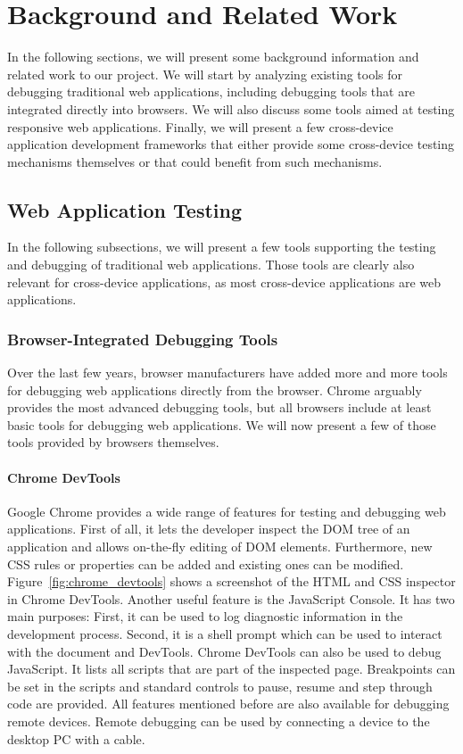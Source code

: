 \chapter{Background and Related Work}

In the following sections, we will present some background information and related work to our project. We will start by analyzing existing tools for debugging traditional web applications, including debugging tools that are integrated directly into browsers. We will also discuss some tools aimed at testing responsive web applications. Finally, we will present a few cross-device application development frameworks that either provide some cross-device testing mechanisms themselves or that could benefit from such mechanisms.

\section{Web Application Testing}

In the following subsections, we will present a few tools supporting the testing and debugging of traditional web applications. Those tools are clearly also relevant for cross-device applications, as most cross-device applications are web applications.

\subsection{Browser-Integrated Debugging Tools}

Over the last few years, browser manufacturers have added more and more tools for debugging web applications directly from the browser. Chrome arguably provides the most advanced debugging tools, but all browsers include at least basic tools for debugging web applications. We will now present a few of those tools provided by browsers themselves.

\subsubsection{Chrome DevTools}

Google Chrome provides a wide range of features for testing and debugging web applications. First of all, it lets the developer inspect the DOM tree of an application and allows on-the-fly editing of DOM elements. Furthermore, new CSS rules or properties can be added and existing ones can be modified. Figure~\ref{fig:chrome_devtools} shows a screenshot of the HTML and CSS inspector in Chrome DevTools. Another useful feature is the JavaScript Console. It has two main purposes: First, it can be used to log diagnostic information in the development process. Second, it is a shell prompt which can be used to interact with the document and DevTools. Chrome DevTools can also be used to debug JavaScript. It lists all scripts that are part of the inspected page. Breakpoints can be set in the scripts and standard controls to pause, resume and step through code are provided. All features mentioned before are also available for debugging remote devices. Remote debugging can be used by connecting a device to the desktop PC with a cable.


